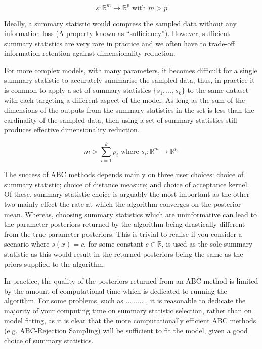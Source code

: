 \documentclass[11pt,a4paper,margin=0]{article}
\theoremstyle{break}
\begin{document}
  \[ s:\mathbb{R}^m\to\mathbb{R}^p\text{ with }m>p \]

  Ideally, a summary statistic would compress the sampled data without any information loss (A property known as ``sufficiency''). However, sufficient summary statistics are very rare in practice and we often have to trade-off information retention against dimensionality reduction.

  \par For more complex models, with many parameters, it becomes difficult for a single summary statistic to accurately summarise the sampled data, thus, in practice it is common to apply a set of summary statistics $\{s_1,\dots,s_k\}$ to the same dataset with each targeting a different aspect of the model. As long as the sum of the dimensions of the outputs from the summary statistics in the set is less than the cardinality of the sampled data, then using a set of summary statistics still produces effective dimensionality reduction. %

  \[ m>\sum_{i=1}^kp_i\text{ where }s_i:\mathbb{R}^m\to\mathbb{R}^{p_i} \]

  The success of ABC methods depends mainly on three user choices: choice of summary statistic; choice of distance measure; and choice of acceptance kernel. Of these, summary statistic choice is arguably the most important as the other two mainly effect the rate at which the algorithm converges on the posterior mean. Whereas, choosing summary statistics which are uninformative can lead to the parameter posteriors returned by the algorithm being drastically different from the true parameter posteriors. This is trivial to realise if you consider a scenario where $s(x)=c$, for some constant $c\in\mathbb{R}$, is used as the sole summary statistic as this would result in the returned posteriors being the same as the priors supplied to the algorithm.

  \par In practice, the quality of the posteriors returned from an ABC method is limited by the amount of computational time which is dedicated to running the algorithm. For some problems, such as ......... %
  , it is reasonable to dedicate the majority of your computing time on summary statistic selection, rather than on model fitting, as it is clear that the more computationally efficient ABC methods (e.g. ABC-Rejection Sampling) will be sufficient to fit the model, given a good choice of summary statistics.
\end{document}
